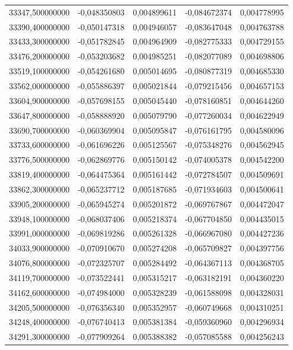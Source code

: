 \begin{longtable}{rrrrr}
33347,500000000 & -0,048350803 & 0,004899611 & -0,084672374 & 0,004778995\\
33390,400000000 & -0,050147318 & 0,004946057 & -0,083647048 & 0,004763788\\
33433,300000000 & -0,051782845 & 0,004964909 & -0,082775333 & 0,004729155\\
33476,200000000 & -0,053203682 & 0,004985251 & -0,082077089 & 0,004698806\\
33519,100000000 & -0,054261680 & 0,005014695 & -0,080877319 & 0,004685330\\
33562,000000000 & -0,055886397 & 0,005021844 & -0,079215456 & 0,004657153\\
33604,900000000 & -0,057698155 & 0,005045440 & -0,078160851 & 0,004644260\\
33647,800000000 & -0,058888920 & 0,005079790 & -0,077260034 & 0,004622949\\
33690,700000000 & -0,060369904 & 0,005095847 & -0,076161795 & 0,004580096\\
33733,600000000 & -0,061696226 & 0,005125567 & -0,075348276 & 0,004562945\\
33776,500000000 & -0,062869776 & 0,005150142 & -0,074005378 & 0,004542200\\
33819,400000000 & -0,064475364 & 0,005161442 & -0,072784507 & 0,004509691\\
33862,300000000 & -0,065237712 & 0,005187685 & -0,071934603 & 0,004500641\\
33905,200000000 & -0,065945274 & 0,005201872 & -0,069767867 & 0,004472047\\
33948,100000000 & -0,068037406 & 0,005218374 & -0,067704850 & 0,004435015\\
33991,000000000 & -0,069819286 & 0,005261328 & -0,066967080 & 0,004427236\\
34033,900000000 & -0,070910670 & 0,005274208 & -0,065709827 & 0,004397756\\
34076,800000000 & -0,072325707 & 0,005284492 & -0,064367113 & 0,004368705\\
34119,700000000 & -0,073522441 & 0,005315217 & -0,063182191 & 0,004360220\\
34162,600000000 & -0,074984000 & 0,005328239 & -0,061588098 & 0,004328031\\
34205,500000000 & -0,076356340 & 0,005352957 & -0,060749668 & 0,004310251\\
34248,400000000 & -0,076740413 & 0,005381384 & -0,059360960 & 0,004296934\\
34291,300000000 & -0,077909264 & 0,005388382 & -0,057085588 & 0,004256243\\

\end{longtable}
